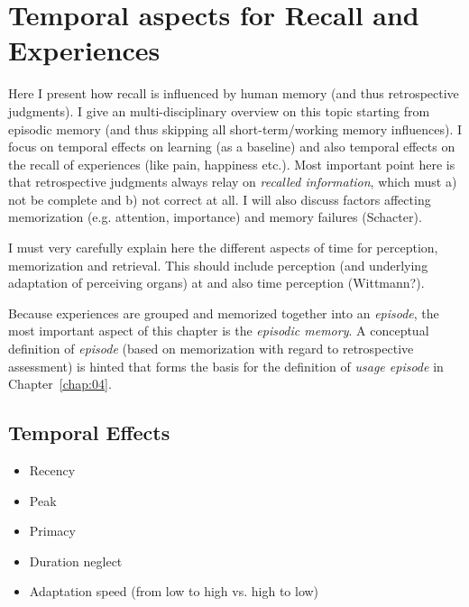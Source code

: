 \chapter{Temporal aspects for Recall and Experiences}\label{chap:03}
\begin{chapter-abstract}
Here I present how recall is influenced by human memory (and thus retrospective judgments).
I give an multi-disciplinary overview on this topic starting from episodic memory (and thus skipping all short-term/working memory influences).
I focus on temporal effects on learning (as a baseline) and also temporal effects on the recall of experiences (like pain, happiness etc.).
Most important point here is that retrospective judgments always relay on \textit{recalled information}, which must a) not be complete and b) not correct at all.
I will also discuss factors affecting memorization (e.g. attention, importance) and memory failures (Schacter).

I must very carefully explain here the different aspects of time for perception, memorization and retrieval.
This should include perception (and underlying adaptation of perceiving organs) at and also time perception (Wittmann?).


Because experiences are grouped and memorized together into an \textit{episode}, the most important aspect of this chapter is the \textit{episodic memory}.
A conceptual definition of \emph{episode} (based on memorization with regard to retrospective assessment) is hinted that forms the basis for the definition of \textit{usage episode} in Chapter~\ref{chap:04}.
\end{chapter-abstract}

\section{Temporal Effects}
\begin{itemize}
\item Recency
\item Peak
\item Primacy
\item Duration neglect
\item Adaptation speed (from low to high vs. high to low)
\end{itemize}


